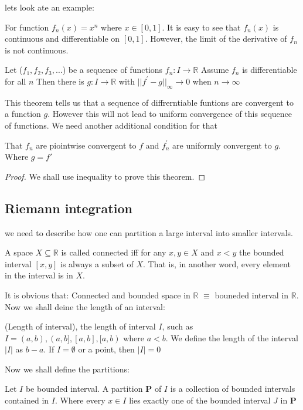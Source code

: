 \documentclass{article}
\newcommand{\R}{\mathbb{R}}
\begin{document}
lets look ate an example:
\begin{example}
  For function $f_n(x)=x^n$ where $x\in [0,1]$. It is easy to see that $f_n(x)$ is continuous and differentiable on $[0,1]$. However, the limit of the derivative of $f_n$ is not continuous. 
\end{example}

\begin{theorem}
Let ($f_1,f_2,f_3,\dots$) be a sequence of functions  $f_n:I\to \R$ 
Assume $f_n$ is differentiable for all $n$
Then there is $g:I\to \R$ with $||f^{'}-g||_{\infty} \to 0$ when $n\to \infty$
\end{theorem}
This theorem tells us that a sequence of diffrerntiable funtions are convergent to a function \(g\).
However this will not lead to uniform convergence of this sequence of functions.
We need another additional condition for that

\begin{center}
  That $f_n$ are piointwise convergent to $f$ and $f_n^{'}$ are uniformly convergent to $g$. Where $g=f'$
\end{center}


\begin{proof}
  We shall use inequality to prove this theorem.
\end{proof}

\subsection{Riemann integration}
we need to describe how one can partition a large interval into smaller intervals.
\begin{definition}
	A space $X\subseteq \R$ is called connected iff for any $x,y\in X$ and $x<y$ the bounded interval $[x,y]$ is always a subset of $X$. That is, in another word, every element in the interval is in $X$.
\end{definition}
It is obvious that: Connected and bounded space in $\R$ $\equiv$ bouneded interval in $\R$. 
Now we shall deine the length of an interval:
\begin{definition}
	(Length of interval), the length of interval $I$, such as $I=(a,b),(a,b],[a,b],[a,b)$ where $a<b$. We define the length of the interval $|I|$ as $b-a$. If $I=\emptyset$ or a point, then $|I|=0$
\end{definition}

Now we shall define the partitions:
\begin{definition}
	Let $I$ be bounded interval. A partition \textbf{P} of $I$ is a collection of bounded intervals contained in $I$. Where every $x\in I$ lies exactly one of the bounded interval $J$ in \textbf{P}  
\end{definition}
\end{document}
